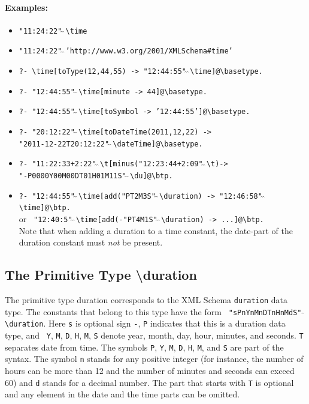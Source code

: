 \documentclass[11pt]{article}
\newcommand{\bs}{\textbackslash}
\begin{document}
\paragraph{Examples:}
\begin{itemize}
\item {\tt "11:24:22"$\hat{~}\hat{~}$\bs{}time}
\item {\tt "11:24:22"$\hat{~}\hat{~}$'http://www.w3.org/2001/XMLSchema\#time'}
\item {\tt ?- \bs{}time[toType(12,44,55) ->
    "12:44:55"$\hat{~}\hat{~}$\bs{}time]@\bs{}basetype.}
\item {\tt ?- "12:44:55"$\hat{~}\hat{~}$\bs{}time[minute -> 44]@\bs{}basetype.}
\item {\tt ?- "12:44:55"$\hat{~}\hat{~}$\bs{}time[toSymbol -> '12:44:55']@\bs{}basetype.}
\item \texttt{?- "20:12:22"$\hat{~}\hat{~}$\bs{}time[toDateTime(2011,12,22) ->}
  \\
  \hspace*{5cm}
  \texttt{"2011-12-22T20:12:22"$\hat{~}\hat{~}$\bs{}dateTime]@\bs{}basetype.}
\item \texttt{?- "11:22:33+2:22"$\hat{~}\hat{~}$\bs{}t[minus("12:23:44+2:09"$\hat{~}\hat{~}$\bs{}t)->}
  \\
  \hspace*{5cm}\texttt{"-P0000Y00M00DT01H01M11S"$\hat{~}\hat{~}$\bs{}du]@\bs{}btp.}
\item {\tt ?- "12:44:55"$\hat{~}\hat{~}$\bs{}time[add("PT2M3S"$\hat{~}\hat{~}$\bs{}duration) -> "12:46:58"$\hat{~}\hat{~}$\bs{}time]@\bs{}btp. }\\
 or {\tt
   "12:40:5"$\hat{~}\hat{~}$\bs{}time[add(-"PT4M1S"$\hat{~}\hat{~}$\bs{}duration)
   -> ...]@\bs{}btp. }\\
  Note that when adding a duration to a time constant, the date-part of the duration
  constant must \emph{not} be present. 
\end{itemize}

\subsection{ The Primitive Type \bs{}duration}

\index{datatype!\bs{}duration}
The primitive type duration corresponds to the XML Schema {\tt duration}
data type. The constants that belong to this type have the form {\tt
  "sPnYnMnDTnHnMdS"$\hat{~}\hat{~}$\bs{}duration}.  Here {\tt s} is optional
sign {\tt -}, {\tt P} indicates that this is a duration data type, and {\tt
  Y}, {\tt M}, {\tt D}, {\tt H}, {\tt M}, {\tt S} denote year, month, day,
hour, minutes, and seconds. {\tt T} separates date from time. The symbols
{\tt P}, {\tt Y}, {\tt M}, {\tt D}, {\tt H}, {\tt M}, and {\tt S} are part
of the syntax.  The symbol {\tt n} stands for any positive integer (for
instance, the number of hours can be more than 12 and the number of minutes
and seconds can exceed 60) and {\tt d} stands for a decimal number. The part that starts with {\tt T}  is optional
and any element in the date and the time parts can be omitted.
\end{document}
